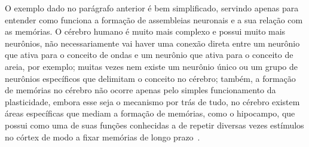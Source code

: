 O exemplo dado no parágrafo anterior é bem simplificado, servindo apenas para entender como funciona a formação de assembleias
neuronais e a sua relação com as memórias. O cérebro humano é muito mais complexo e possui muito mais neurônios, não
necessariamente vai haver uma conexão direta entre um neurônio que ativa para o conceito de ondas e um neurônio que ativa para o
conceito de areia, por exemplo; muitas vezes nem existe um neurônio único ou um grupo de neurônios específicos que delimitam o
conceito no cérebro; também, a formação de memórias no cérebro não ocorre apenas pelo simples funcionamento da plasticidade,
embora esse seja o mecanismo por trás de tudo, no cérebro existem áreas específicas que mediam a formação de memórias, como o
hipocampo, que possui como uma de suas funções conhecidas a de repetir diversas vezes estímulos no córtex de modo a fixar memórias
de longo prazo~\cite{guptaHippocampal2010}.
